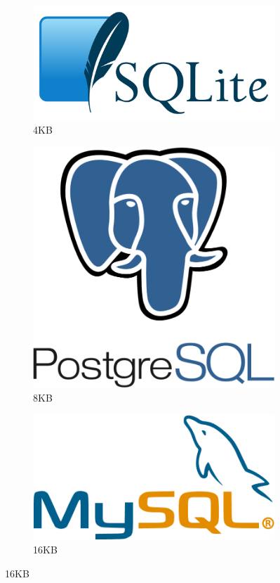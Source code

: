 \documentclass[aspectratio=169, 14pt]{beamer}
\begin{document}
\begin{frame}[fragile]
	\noindent\makebox[\linewidth]{\rule{\paperwidth}{0.4pt}}
	\begin{figure}
		\centering
		\begin{subfigure}[b]{0.3\textwidth}
			\centering
			\includegraphics[width=\textwidth]{image/sqlite}
			\caption{4KB}
		\end{subfigure}
		\hfill
		\begin{subfigure}[b]{0.3\textwidth}
			\centering
			\includegraphics[width=.6\textwidth]{image/pg}
			\caption{8KB}
		\end{subfigure}
		\hfill
		\begin{subfigure}[b]{0.3\textwidth}
			\centering
			\includegraphics[width=\textwidth]{image/mysql}
			\caption{16KB}
		\end{subfigure}
	\end{figure}

\end{frame}
\end{document}
